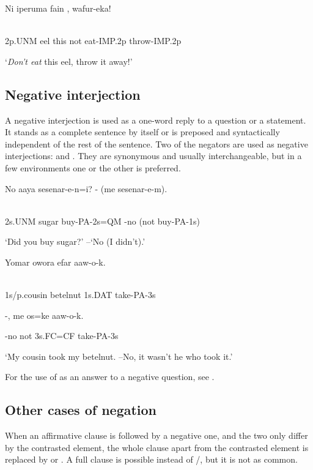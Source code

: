 \ea%
\label{ex:x1110}
\gll Ni  iperuma  fain  \textstyleEmphasizedVernacularWords{{{\textprimstress}}},  wafur-eka! \\
      \\
\glt
\z

2p.UNM  eel  this  not  eat-IMP.2p  throw-IMP.2p

`\textit{Don't eat}  this eel, throw it away!'

\subsection{Negative interjection}
\hypertarget{RefHeading22441935131865}{}
A negative interjection is used as a one-word reply to a question or a statement. It stands as a complete sentence by itself or is preposed and syntactically independent of the rest of the sentence. Two of the negators are used as negative interjections:  and . They are synonymous and usually interchangeable, but in a few environments one or the other is preferred.

\ea%
\label{ex:x1115}
\gll No  aaya  sesenar-e-n=i?  -  (me  sesenar-e-m). \\
      \\
\glt
\z

2s.UNM  sugar  buy-PA-2s=QM  -no  (not  buy-PA-1s)

`Did you buy sugar?' --`No (I didn't).'

\ea%
\label{ex:x1116}
\gll Yomar  owora  efar  aaw-o-k.  \\
      \\
\glt
\z

1s/p.cousin  betelnut  1s.DAT  take-PA-3s

-,  me  os=ke  aaw-o-k.

-no  not  3s.FC=CF  take-PA-3s

`My cousin took my betelnut. --No, it wasn't he who took it.'

For the use of  as an answer to a negative question, see .

\subsection{Other cases of negation}
\hypertarget{RefHeading22461935131865}{}
When an affirmative clause is followed by a negative one, and the two only differ by the contrasted element, the whole clause apart from the contrasted element is replaced by  or . A full clause is possible instead of /, but it is not as common.

